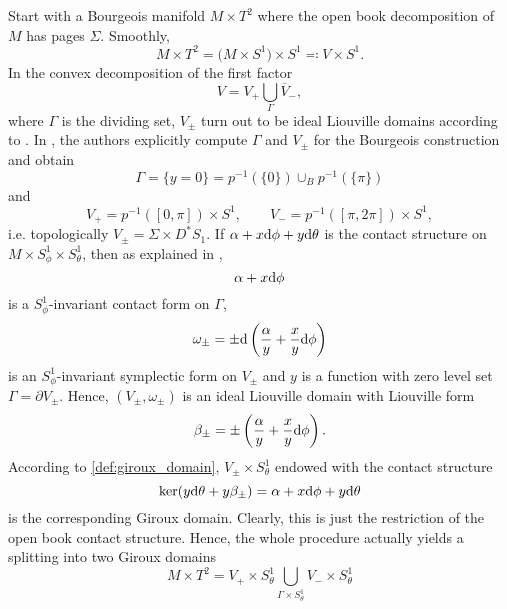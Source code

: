 Start with a Bourgeois manifold $M \times T^2$ where the open book decomposition of $M$ has pages $\Sigma$.
Smoothly,
\[
    M \times T^2 
    = \big(M \times S^1\big) \times S^1 
    \eqqcolon V \times S^1.
\]
In the convex decomposition of the first factor
\[
    V = V_+ \bigcup_\Gamma \overline{V}_-,
\]
where $\Gamma$ is the dividing set, $V_\pm$ turn out to be ideal Liouville domains according to \cite[Section 6]{DG12}.
In \cite[Section 5.3]{DG12}, the authors explicitly compute $\Gamma$ and 
$V_\pm$ for the Bourgeois construction and obtain %
\[
    \Gamma = \{y = 0\} = p^{-1}(\{0\}) \cup_B p^{-1}(\{\pi\})
\]
and
\[
    V_+ = p^{-1}([0, \pi]) \times S^1, \qquad V_- = p^{-1}([\pi, 2\pi]) \times S^1,
\]
i.e. topologically $V_\pm = \Sigma \times D^*S_1$.
If $\alpha + x \mathrm{d} \phi + y \mathrm{d} \theta$ is the contact structure on $M\times S^1_\phi \times S^1_\theta$,
then as explained in \cite[Section 5.3]{DG12}, 
\[ 
\alpha + x \mathrm{d} \phi
\] 
is a 
$S^1_\phi$-invariant contact form on $\Gamma$,
\[
    \omega_\pm = \pm \mathrm{d} \left(\frac{\alpha}{y} + \frac{x}{y}\mathrm{d} \phi\right) 
\]
is an $S^1_\phi$-invariant symplectic form on $V_\pm$ and
$y$ is a function with zero level set $\Gamma = \partial V_\pm$.
Hence, $(V_\pm, \omega_\pm)$ is an ideal Liouville domain with Liouville form
\[
    \beta_\pm = \pm \left(\frac{\alpha}{y} + \frac{x}{y}\mathrm{d} \phi\right).
\]
According to \cref{def:giroux_domain}, $V_\pm \times S^1_\theta$
endowed with the contact structure 
\[
    \ker(y \mathrm{d} \theta + y \beta_\pm) = \alpha + x \mathrm{d} \phi + y \mathrm{d} \theta
\]
is the corresponding Giroux domain. Clearly, this is just the restriction
of the open book contact structure. Hence, the whole procedure actually yields a
splitting into two Giroux domains
\[
    M\times T^2 = V_+ \times S^1_\theta 
    \bigcup_{\Gamma \times S^1_\theta} V_- \times S^1_\theta
\]